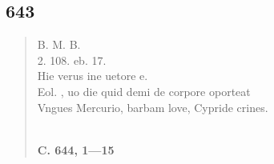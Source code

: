 \documentclass[11pt, a4paper]{report}
\begin{document}
            \subsection*{643}
      \begin{verse}
      B. M. B. \\ 2. 108. eb. 17. \\ Hie verus ine uetore e. \\ Eol. , uo die quid demi de corpore oporteat \\ Vngues Mercurio, barbam love, Cypride crines. \\ 
        ﻿\pagebreak 
     \marginpar{[110]} \begin{center} \textbf{C. 644, 1—15} \end{center}
      \end{verse}
  
\end{document}

